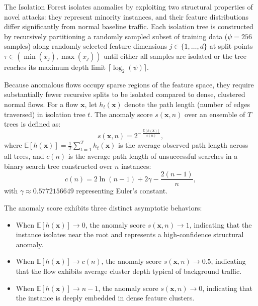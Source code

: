 The Isolation Forest isolates anomalies by exploiting two structural properties of novel attacks: they represent minority instances, and their feature distributions differ significantly from normal baseline traffic. Each isolation tree is constructed by recursively partitioning a randomly sampled subset of training data ($\psi = 256$ samples) along randomly selected feature dimensions $j \in \{1, \dots, d\}$ at split points $\tau \in (\min(x_j), \max(x_j))$ until either all samples are isolated or the tree reaches its maximum depth limit $\lceil \log_2(\psi) \rceil$.

Because anomalous flows occupy sparse regions of the feature space, they require substantially fewer recursive splits to be isolated compared to dense, clustered normal flows. For a flow $\mathbf{x}$, let $h_t(\mathbf{x})$ denote the path length (number of edges traversed) in isolation tree $t$. The anomaly score $s(\mathbf{x}, n)$ over an ensemble of $T$ trees is defined as:
\begin{equation}
s(\mathbf{x}, n) = 2^{-\,\frac{\mathbb{E}[h(\mathbf{x})]}{c(n)}},
\label{eq:isolation_score}
\end{equation}
where $\mathbb{E}[h(\mathbf{x})] = \frac{1}{T}\sum_{t=1}^{T} h_t(\mathbf{x})$ is the average observed path length across all trees, and $c(n)$ is the average path length of unsuccessful searches in a binary search tree constructed over $n$ instances:
\begin{equation}
c(n) = 2 \ln(n - 1) + 2\gamma - \frac{2(n - 1)}{n},
\label{eq:bst_average_depth}
\end{equation}
with $\gamma \approx 0.5772156649$ representing Euler's constant.

The anomaly score exhibits three distinct asymptotic behaviors:
\begin{itemize}
    \item When $\mathbb{E}[h(\mathbf{x})] \to 0$, the anomaly score $s(\mathbf{x}, n) \to 1$, indicating that the instance isolates near the root and represents a high-confidence structural anomaly.
    \item When $\mathbb{E}[h(\mathbf{x})] \to c(n)$, the anomaly score $s(\mathbf{x}, n) \to 0.5$, indicating that the flow exhibits average cluster depth typical of background traffic.
    \item When $\mathbb{E}[h(\mathbf{x})] \to n - 1$, the anomaly score $s(\mathbf{x}, n) \to 0$, indicating that the instance is deeply embedded in dense feature clusters.
\end{itemize}

